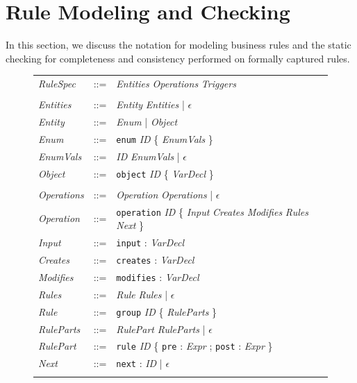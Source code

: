 
\newcommand{\term}{\textit}
\newcommand{\lit}{\texttt}

\section{Rule Modeling and Checking}
\label{sec:model}

In this section, we discuss the notation for modeling business rules and the
static checking for completeness and consistency performed on formally captured
rules.

\begin{figure}[t]
\centering
{\small
\tabcolsep=3pt
\begin{tabular}{lll}
\term{RuleSpec} & ::= & \term{Entities} \term{Operations} \term{Triggers} \\
\\
\term{Entities} & ::= & \term{Entity} \term{Entities} | $\epsilon$ \\
\term{Entity} & ::= & \term{Enum} | \term{Object} \\
\term{Enum} & ::= & \lit{enum} \term{ID} \{ \term{EnumVals} \} \\
\term{EnumVals} & ::= & \term{ID} \term{EnumVals} | $\epsilon$ \\
\term{Object} & ::= & \lit{object} \term{ID} \{ \term{VarDecl} \} \\
\\
\term{Operations} & ::= & \term{Operation} \term{Operations} | $\epsilon$ \\
\term{Operation} & ::= & \lit{operation} \term{ID} \{ \term{Input}
\term{Creates} \term{Modifies} \term{Rules} \term{Next} \} \\
\term{Input} & ::= & \lit{input} : \term{VarDecl} \\
\term{Creates} & ::= & \lit{creates} : \term{VarDecl} \\
\term{Modifies} & ::= & \lit{modifies} : \term{VarDecl} \\
\term{Rules} & ::= & \term{Rule} \term{Rules} | $\epsilon$ \\
\term{Rule} & ::= & \lit{group} \term{ID} \{ \term{RuleParts} \} \\
\term{RuleParts} & ::= & \term{RulePart} \term{RuleParts} | $\epsilon$ \\
\term{RulePart} & ::= & \lit{rule} \term{ID} \{ \lit{pre} : \term{Expr} ;
\lit{post} : \term{Expr} \} \\
\term{Next} & ::= & \lit{next} : \term{ID} | $\epsilon$ \\
\\

\end{tabular}}
\end{figure}
